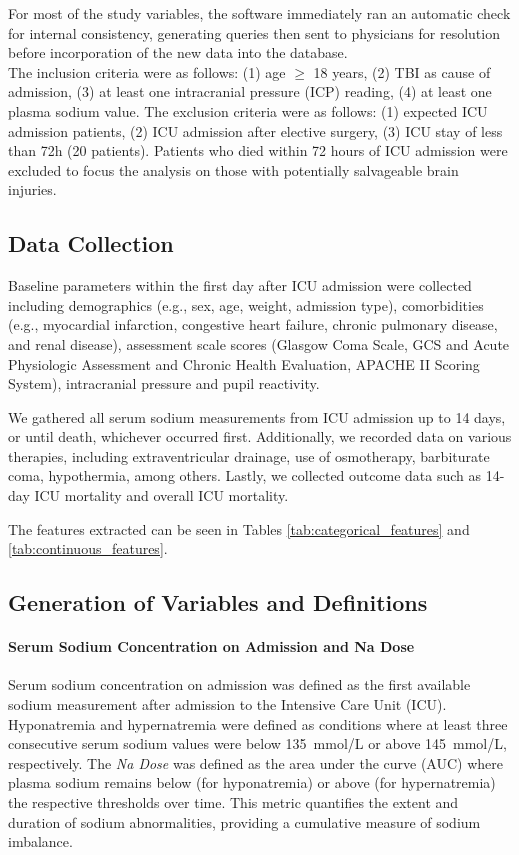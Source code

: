 For most of the study variables, the software immediately ran an automatic check for internal consistency, generating queries then sent to physicians for resolution before incorporation of the new data into the database.\\

The inclusion criteria were as follows: (1) age $\geq$ 18 years, (2) TBI as cause of admission, (3) at least one intracranial pressure (ICP) reading, (4) at least one plasma sodium value.
The exclusion criteria were as follows: (1) expected ICU admission patients, (2) ICU admission after elective surgery, (3) ICU stay of less than 72h (20 patients). Patients who died within 72 hours of ICU admission were excluded to focus the analysis on those with potentially salvageable brain injuries.

\subsection{Data Collection}
Baseline parameters within the first day after ICU admission were collected including demographics (e.g., sex, age, weight, admission type), comorbidities (e.g., myocardial infarction, congestive heart failure, chronic pulmonary disease, and renal disease), assessment scale scores (Glasgow Coma Scale, GCS and Acute Physiologic Assessment and Chronic Health Evaluation, APACHE II Scoring System), intracranial pressure and pupil reactivity.

We gathered all serum sodium measurements from ICU admission up to 14 days, or until death, whichever occurred first. Additionally, we recorded data on various therapies, including extraventricular drainage, use of osmotherapy, barbiturate coma, hypothermia, among others. Lastly, we collected outcome data such as 14-day ICU mortality and overall ICU mortality.

The features extracted can be seen in Tables \ref{tab:categorical_features} and \ref{tab:continuous_features}.

\subsection{Generation of Variables and Definitions}

\paragraph{Serum Sodium Concentration on Admission and Na Dose}

Serum sodium concentration on admission was defined as the first available sodium measurement after admission to the Intensive Care Unit (ICU). Hyponatremia and hypernatremia were defined as conditions where at least three consecutive serum sodium values were below 135~mmol/L or above 145~mmol/L, respectively. The \textit{Na Dose} was defined as the area under the curve (AUC) where plasma sodium remains below (for hyponatremia) or above (for hypernatremia) the respective thresholds over time. This metric quantifies the extent and duration of sodium abnormalities, providing a cumulative measure of sodium imbalance.

